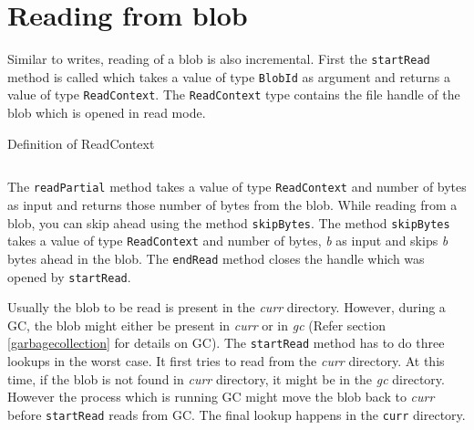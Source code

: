 \section{Reading from blob} \label{readblob}
Similar to writes, reading of a blob is also incremental. First the \texttt{startRead} method is called which takes a value of type \texttt{BlobId} as argument and returns a value of type \texttt{ReadContext}. The \texttt{ReadContext} type  contains the file handle of the blob which is opened in read mode.

\begin{program}
  \caption{Definition of ReadContext}
  \label{fig:defreadcontext}
  \inputminted{haskell}{hs/readcontext.hs}
\end{program}

The \texttt{readPartial} method takes a value of type \texttt{ReadContext} and number of bytes as input and returns those number of bytes from the blob.
While reading from a blob, you can skip ahead using the method \texttt{skipBytes}. The method \texttt{skipBytes} takes a value of type \texttt{ReadContext} and number of bytes, \textit{b} as input and skips \textit{b} bytes ahead in the blob.
The \texttt{endRead} method closes the handle which was opened by \texttt{startRead}.

Usually the blob to be read is present in the \textit{curr} directory. However, during a GC, the blob might either be present in \textit{curr} or in \textit{gc} (Refer section \ref{garbagecollection} for details on GC). The \texttt{startRead} method has to do three lookups in the worst case. It first tries to read from the \textit{curr} directory.
At this time, if the blob is not found in \textit{curr} directory, it might be in the \textit{gc} directory. However the process which is running GC might move the blob back to \textit{curr} before \texttt{startRead} reads from GC. The final lookup happens in the \texttt{curr} directory.

